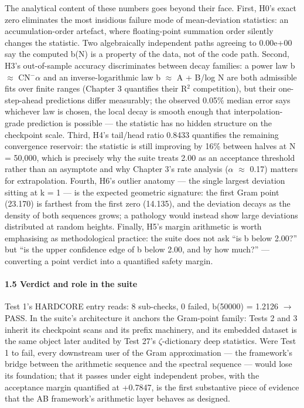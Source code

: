 \documentclass[10pt]{article}
\begin{document}
The analytical content of these numbers goes beyond their face. First, H0's exact zero eliminates the most insidious failure mode of mean-deviation statistics: an accumulation-order artefact, where floating-point summation order silently changes the statistic. Two algebraically independent paths agreeing to 0.00e+00 say the computed b(N) is a property of the data, not of the code path. Second, H3's out-of-sample accuracy discriminates between decay families: a power law b $\approx$ C\textperiodcentered{}N$^-$$\alpha$ and an inverse-logarithmic law b $\approx$ A + B/log N are both admissible fits over finite ranges (Chapter 3 quantifies their R$^2$ competition), but their one-step-ahead predictions differ measurably; the observed 0.05\% median error says whichever law is chosen, the local decay is smooth enough that interpolation-grade prediction is possible --- the statistic has no hidden structure on the checkpoint scale. Third, H4's tail/head ratio 0.8433 quantifies the remaining convergence reservoir: the statistic is still improving by 16\% between halves at N = 50,000, which is precisely why the suite treats 2.00 as an acceptance threshold rather than an asymptote and why Chapter 3's rate analysis ($\alpha$ $\approx$ 0.17) matters for extrapolation. Fourth, H6's outlier anatomy --- the single largest deviation sitting at k = 1 --- is the expected geometric signature: the first Gram point (23.170) is farthest from the first zero (14.135), and the deviation decays as the density of both sequences grows; a pathology would instead show large deviations distributed at random heights. Finally, H5's margin arithmetic is worth emphasising as methodological practice: the suite does not ask ``is b below 2.00?'' but ``is the upper confidence edge of b below 2.00, and by how much?'' --- converting a point verdict into a quantified safety margin.

\paragraph{1.5 Verdict and role in the suite}

Test 1's HARDCORE entry reads: 8 sub-checks, 0 failed, b(50000) = 1.2126 $\rightarrow$ PASS. In the suite's architecture it anchors the Gram-point family: Tests 2 and 3 inherit its checkpoint scans and its prefix machinery, and its embedded dataset is the same object later audited by Test 27's $\zeta$-dictionary deep statistics. Were Test 1 to fail, every downstream user of the Gram approximation --- the framework's bridge between the arithmetic sequence and the spectral sequence --- would lose its foundation; that it passes under eight independent probes, with the acceptance margin quantified at +0.7847, is the first substantive piece of evidence that the AB framework's arithmetic layer behaves as designed.
\end{document}
